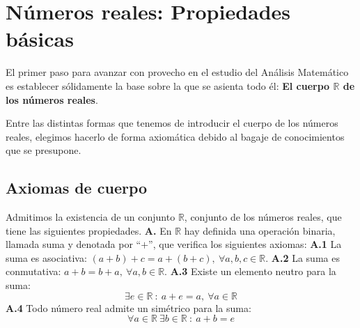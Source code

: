 \chapter{Números reales: Propiedades básicas}\label{chp:Tema1}
    
El primer paso para avanzar con provecho en el estudio del Análisis Matemático es establecer
sólidamente la base sobre la que se asienta todo él: \textbf{El cuerpo $\mathbb{R}$ de los números reales}.

Entre las distintas formas que tenemos de introducir el cuerpo de los números reales, elegimos hacerlo
de forma axiomática debido al bagaje de conocimientos que se presupone.


\section{Axiomas de cuerpo}
Admitimos la existencia de un conjunto $\mathbb{R}$, conjunto de los números reales, que tiene las
siguientes propiedades.
\newline
\newline
\textbf{A.}\label{Axioma_A} En $\mathbb{R}$ hay definida una operación binaria, llamada suma y denotada por ``$+$'', que
verifica los siguientes axiomas:
\newline
\newline
\hspace*{1cm} \textbf{A.1} La suma es asociativa: $(a+b)+c=a+(b+c), ~\forall a,b,c \in \mathbb{R}$.
\newline
\hspace*{1cm} \textbf{A.2} La suma es conmutativa: $a+b=b+a, ~\forall a,b \in \mathbb{R}$.
\newline
\hspace*{1cm} \textbf{A.3} Existe un elemento neutro para la suma:
\begin{equation*}
    \exists e \in \mathbb{R} ~:~a+e=a,~ \forall a \in \mathbb{R}
\end{equation*}
\hspace*{1cm} \textbf{A.4} Todo número real admite un simétrico para la suma:
\begin{equation*}
    \forall a \in \mathbb{R}~ \exists b \in \mathbb{R} ~:~a+b=e
\end{equation*}

